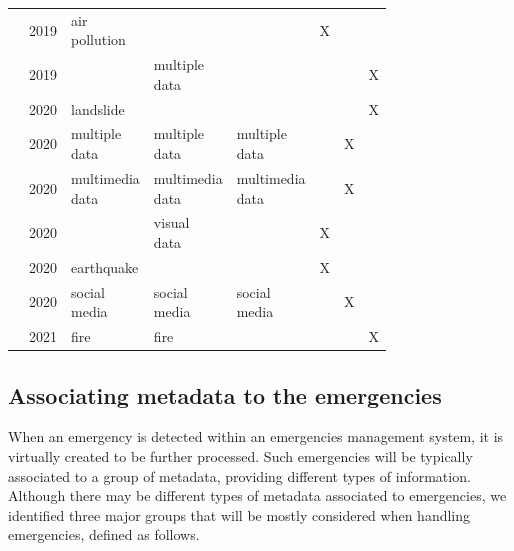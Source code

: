 \begin{refsection}
\begin{table}
{\begin{tabular}{llllllll}
    \citeauthor{iotPollution1} & 2019 & \makecell[l]{air\\pollution} & & & X & & \\
    \citeauthor{Alkhatib2019771} & 2019 & & \makecell[l]{multiple\\data} & & & & X \\
    \citeauthor{BRAGAGNOLO2020104240} & 2020 & landslide & & & & & X \\
    \citeauthor{emergenciesmetric2} & 2020 & \makecell[l]{multiple\\data} & \makecell[l]{multiple\\data} &  \makecell[l]{multiple\\data} &  & X & \\
    \citeauthor{emergenciesmetric3} & 2020 & \makecell[l]{multimedia\\data} & \makecell[l]{multimedia\\data} & \makecell[l]{multimedia\\data} &  & X &\\
    \citeauthor{iotCovid1} & 2020 &  & \makecell[l]{visual\\data} &  & X & & \\
    \citeauthor{iotEarthquake1} & 2020 & earthquake &  &  & X & & \\
    \citeauthor{twitterDetection1} & 2020 & \makecell[l]{social\\media} & \makecell[l]{social\\media} &  \makecell[l]{social\\media} &  & X & \\
    \citeauthor{fireBigdata1} & 2021 & fire & fire & & & & X \\
    \hline
  \end{tabular}
  }
\end{table}

\subsection{Associating metadata to the emergencies}

When an emergency is detected within an emergencies management system, it is virtually created to be further processed. Such emergencies will be typically associated to a group of metadata, providing different types of information. Although there may be different types of metadata associated to emergencies, we identified three major groups that will be mostly considered when handling emergencies, defined as follows.


\end{refsection}
